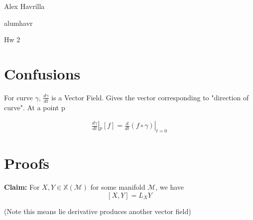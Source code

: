 \documentclass[11pt]{article}
\newcommand{\m}{\mathcal{M}}
\newcommand{\myname}{Alex Havrilla}
\newcommand{\myandrew}{alumhavr}
\newcommand{\myhwnum}{Hw 2}
\begin{document}
\medskip                        

\thispagestyle{plain}
\begin{center}

{\myname}

\myandrew

\myhwnum

\end{center}

\section{Confusions}

For curve $\gamma$, $\frac{d\gamma}{dt}$ is a Vector Field. Gives the vector corresponding to "direction of curve". At a point p

\begin{align*}
	\frac{d\gamma}{dt}|_p[f] = \frac{d}{dt}(f \circ \gamma) |_{t = 0}
\end{align*}

\section{Proofs}

\textbf{Claim:} For $X,Y \in \mathbb{X}(\m)$ for some manifold $\m$, we have
\[
	[X,Y] = L_XY
\]

(Note this means lie derivative produces another vector field)
\end{document}
